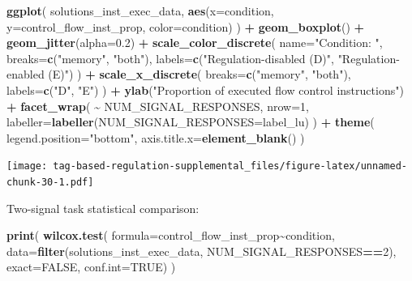 \documentclass[
]{book}
\newenvironment{Shaded}{\begin{snugshade}}{\end{snugshade}}
\newcommand{\DataTypeTok}[1]{\textcolor[rgb]{0.13,0.29,0.53}{#1}}
\newcommand{\DecValTok}[1]{\textcolor[rgb]{0.00,0.00,0.81}{#1}}
\newcommand{\FloatTok}[1]{\textcolor[rgb]{0.00,0.00,0.81}{#1}}
\newcommand{\KeywordTok}[1]{\textcolor[rgb]{0.13,0.29,0.53}{\textbf{#1}}}
\newcommand{\NormalTok}[1]{#1}
\newcommand{\OperatorTok}[1]{\textcolor[rgb]{0.81,0.36,0.00}{\textbf{#1}}}
\newcommand{\OtherTok}[1]{\textcolor[rgb]{0.56,0.35,0.01}{#1}}
\newcommand{\StringTok}[1]{\textcolor[rgb]{0.31,0.60,0.02}{#1}}
\begin{document}
\begin{Shaded}
\begin{Highlighting}[]
\KeywordTok{ggplot}\NormalTok{( solutions\_inst\_exec\_data, }\KeywordTok{aes}\NormalTok{(}\DataTypeTok{x=}\NormalTok{condition, }\DataTypeTok{y=}\NormalTok{control\_flow\_inst\_prop, }\DataTypeTok{color=}\NormalTok{condition) ) }\OperatorTok{+}
\StringTok{  }\KeywordTok{geom\_boxplot}\NormalTok{() }\OperatorTok{+}
\StringTok{  }\KeywordTok{geom\_jitter}\NormalTok{(}\DataTypeTok{alpha=}\FloatTok{0.2}\NormalTok{) }\OperatorTok{+}
\StringTok{  }\KeywordTok{scale\_color\_discrete}\NormalTok{(}
    \DataTypeTok{name=}\StringTok{"Condition: "}\NormalTok{,}
    \DataTypeTok{breaks=}\KeywordTok{c}\NormalTok{(}\StringTok{"memory"}\NormalTok{, }\StringTok{"both"}\NormalTok{),}
    \DataTypeTok{labels=}\KeywordTok{c}\NormalTok{(}\StringTok{"Regulation{-}disabled (D)"}\NormalTok{, }\StringTok{"Regulation{-}enabled (E)"}\NormalTok{)}
\NormalTok{  ) }\OperatorTok{+}
\StringTok{  }\KeywordTok{scale\_x\_discrete}\NormalTok{(}
    \DataTypeTok{breaks=}\KeywordTok{c}\NormalTok{(}\StringTok{"memory"}\NormalTok{, }\StringTok{"both"}\NormalTok{),}
    \DataTypeTok{labels=}\KeywordTok{c}\NormalTok{(}\StringTok{"D"}\NormalTok{, }\StringTok{"E"}\NormalTok{)}
\NormalTok{  ) }\OperatorTok{+}
\StringTok{  }\KeywordTok{ylab}\NormalTok{(}\StringTok{"Proportion of executed flow control instructions"}\NormalTok{) }\OperatorTok{+}
\StringTok{  }\KeywordTok{facet\_wrap}\NormalTok{(}
    \OperatorTok{\textasciitilde{}}\StringTok{ }\NormalTok{NUM\_SIGNAL\_RESPONSES,}
    \DataTypeTok{nrow=}\DecValTok{1}\NormalTok{,}
    \DataTypeTok{labeller=}\KeywordTok{labeller}\NormalTok{(}\DataTypeTok{NUM\_SIGNAL\_RESPONSES=}\NormalTok{label\_lu)}
\NormalTok{  ) }\OperatorTok{+}
\StringTok{  }\KeywordTok{theme}\NormalTok{(}
    \DataTypeTok{legend.position=}\StringTok{"bottom"}\NormalTok{,}
    \DataTypeTok{axis.title.x=}\KeywordTok{element\_blank}\NormalTok{()}
\NormalTok{  )}
\end{Highlighting}
\end{Shaded}

\texttt{[image: tag-based-regulation-supplemental\_files/figure-latex/unnamed-chunk-30-1.pdf]}

Two-signal task statistical comparison:

\begin{Shaded}
\begin{Highlighting}[]
\KeywordTok{print}\NormalTok{(}
  \KeywordTok{wilcox.test}\NormalTok{(}
    \DataTypeTok{formula=}\NormalTok{control\_flow\_inst\_prop}\OperatorTok{\textasciitilde{}}\NormalTok{condition,}
    \DataTypeTok{data=}\KeywordTok{filter}\NormalTok{(solutions\_inst\_exec\_data, NUM\_SIGNAL\_RESPONSES}\OperatorTok{==}\DecValTok{2}\NormalTok{),}
    \DataTypeTok{exact=}\OtherTok{FALSE}\NormalTok{,}
    \DataTypeTok{conf.int=}\OtherTok{TRUE}\NormalTok{)}
\NormalTok{)}
\end{Highlighting}
\end{Shaded}
\end{document}
